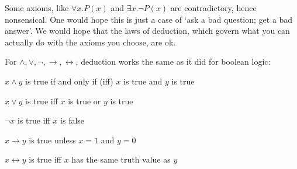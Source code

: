 \message{ !name(truth.tex)}\documentclass{scrbook}
\renewcommand{\implies}{\to}
\renewcommand{\iff}{\leftrightarrow}
\begin{document}
Some axioms, like $\forall x. P(x)$ and $\exists x. \neg P(x)$ are contradictory, hence nonsensical. One would hope this is just a case of `ask a bad question; get a bad answer'. We would hope that the laws of deduction, which govern what you can actually do with the axioms you choose, are ok. 


For $\wedge,\vee,\neg,\implies,\iff$, deduction works the same as it did for boolean logic:
\begin{trivlist}
\item $x \wedge y$ is true if and only if (iff) $x$ is true and $y$ is true
\item $x \vee y$ is true iff $x$ is true or $y$ is true 
\item $\neg x$ is true iff $x$ is false   
\item $x \implies y$ is true unless $x=1$ and $y=0$  
\item $x\iff y$ is true iff $x$ has the same truth value as $y$  
\end{trivlist}
\end{document}
